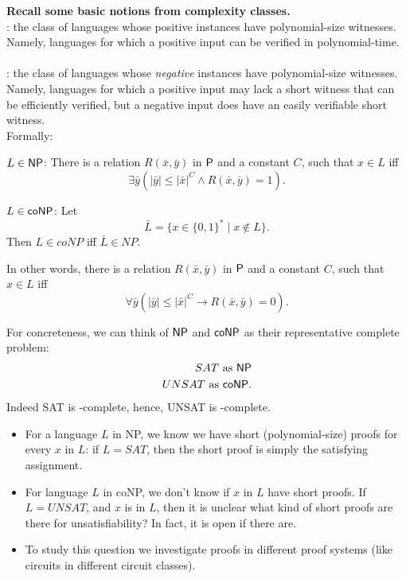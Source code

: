 \begin{tcolorbox}[colframe=white, colback=gray!5, boxrule=0mm, sharp corners]
\textbf{Recall some basic notions from complexity classes.
}
\\

\textbf{\NP}: the class of  languages whose positive instances have polynomial-size witnesses. Namely, languages for which a positive input can be verified in polynomial-time. \\\\
\textbf{\coNP}: the class of  languages whose \textit{negative} instances have
polynomial-size witnesses.
Namely, languages for which a positive input may lack a short witness that can be efficiently verified, but a negative input does have an easily verifiable short witness.\\


Formally:





$L \in \NP$: There is a relation $R(\bar{x}, \bar{y})$ in $\P$ and a constant $C$, such that $x \in L$ iff 
\[ \exists \bar{y} (|\bar{y}| \leq |\bar{x}|^C \land R(\bar{x}, \bar{y}) = 1). \]

$L \in \coNP$: Let 
\[ \bar{L} = \{ x \in \{0,1\}^* \mid x \notin L \}. \]
Then $L \in coNP$ iff $\bar{L} \in NP$.

In other words, there is a relation $R(\bar{x}, \bar{y})$ in $\P$ and a constant $C$, such that $x \in L$ iff 
\[ \forall \bar{y} (|\bar{y}| \leq |\bar{x}|^C \to R(\bar{x}, \bar{y}) = 0). \]

For concreteness, we can think of $\NP$ and $\coNP$ as their representative complete problem:
\begin{align*}
    SAT \text{ as }  \NP \\
    UNSAT \text{ as } \coNP.
\end{align*}
Indeed  SAT is \NP-complete, hence, UNSAT is \coNP-complete.
 

\begin{itemize}
    \item For a language $L$ in NP, we know we have short (polynomial-size) proofs for every $x$ in $L$: if $L = SAT$, then the short proof is simply the satisfying assignment.
    \item For language $L$ in coNP, we don't know if $x$ in $L$ have short proofs. If $L = UNSAT$, and $x$ is in $L$, then it is unclear what kind of short proofs are there for unsatisfiability? In fact, it is open if there are.
    \item To study this question we investigate proofs in different proof systems (like circuits in different circuit classes).
\end{itemize}

\end{tcolorbox}


